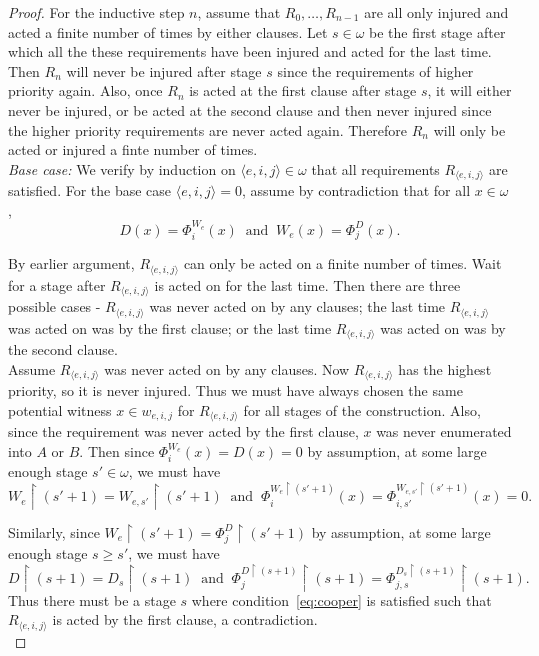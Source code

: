 \documentclass{article}
\begin{document}
\begin{proof}
    For the inductive step $n$, assume that $R_0,\ldots,R_{n-1}$ are all
    only injured and acted a finite number of times by either clauses.
    Let $s\in\omega$ be the first stage after which all the these
    requirements have been injured and acted for the last time. Then
    $R_n$ will never be injured after stage $s$ since the requirements of
    higher priority again. Also, once $R_n$ is acted at the first
    clause after stage $s$, it will either never be injured, or be
    acted at the second clause and then never injured since the higher
    priority requirements are never acted again. Therefore $R_n$ will
    only be acted or injured a finte number of times. \\

    \textit{Base case:} We verify by induction on $\langle
    e,i,j\rangle\in\omega$ that all requirements $R_{\langle e,i,j\rangle}$
    are satisfied. For the base case $\langle e,i,j\rangle=0$, assume by
    contradiction that for all $x\in\omega$,
    \[D(x)=\Phi_i^{W_e}(x)\;\; \text{and}\;\; W_e(x)=\Phi_j^D(x).\]

    By earlier argument, $R_{\langle e,i,j\rangle}$ can only be acted on a
    finite number of times. Wait for a stage after $R_{\langle
    e,i,j\rangle}$ is acted on for the last time. Then there are three
    possible cases - $R_{\langle e,i,j\rangle}$ was never acted on by any
    clauses; the last time $R_{\langle e,i,j\rangle}$ was acted on was by
    the first clause; or the last time $R_{\langle e,i,j\rangle}$ was acted
    on was by the second clause. \\

    Assume $R_{\langle e,i,j\rangle}$ was never acted on by any clauses.
    Now $R_{\langle e,i,j\rangle}$ has the highest priority, so it is never
    injured. Thus we must have always chosen the same potential witness
    $x\in w_{e,i,j}$ for $R_{\langle e,i,j\rangle}$ for all stages of the
    construction. Also, since the requirement was never acted by the first
    clause, $x$ was never enumerated into $A$ or $B$. Then since
    $\Phi_i^{W_e}(x)=D(x)=0$ by assumption, at some large enough stage
    $s'\in\omega$, we must have
    \[W_e\restriction (s'+1) =W_{e,s'}\restriction (s'+1)\;\;
    \text{and}\;\; \Phi_{i}^{W_{e} \restriction (s'+1)}(x)
    =\Phi_{i,s'}^{W_{e,s'} \restriction (s'+1)}(x)=0.\]

    Similarly, since $W_e\restriction(s'+1) =\Phi_j^D\restriction(s'+1)$ by
    assumption, at some large enough stage $s\geq s'$, we must have
    \[D\restriction(s+1) =D_{s}\restriction(s+1)\;\;
    \text{and}\;\; \Phi_{j}^{D\restriction(s+1)}
    \restriction(s+1) =\Phi_{j,s}^{D_{s}\restriction(s+1)}
    \restriction(s+1).\]
    Thus there must be a stage $s$ where condition~\eqref{eq:cooper} is
    satisfied such that $R_{\langle e,i,j\rangle}$ is acted by the first
    clause, a contradiction. \\


\end{proof}
\end{document}
